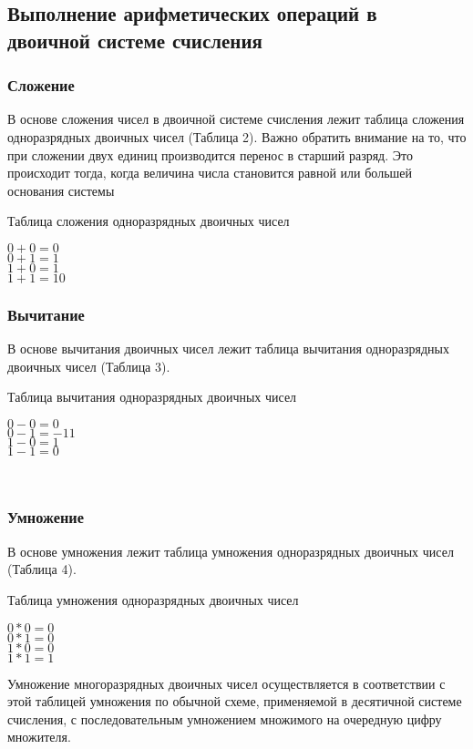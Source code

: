 \documentclass[a4paper]{article}
\begin{document}
\subsection{Выполнение арифметических операций в двоичной системе счисления}

\subsubsection{Сложение}
В основе сложения чисел в двоичной системе счисления лежит таблица сложения одноразрядных двоичных чисел (Таблица 2). Важно обратить внимание на то, что при сложении двух единиц производится перенос в старший разряд. Это происходит тогда, когда величина числа становится равной или большей основания системы
\begin{table}
  \caption{Таблица сложения одноразрядных двоичных чисел}
  \begin{center}
  $0 + 0 = 0$\\
  $0 + 1 = 1$\\
  $1 + 0 = 1$\\
  $1 + 1 = 10$\\
  \end{center}
\end{table}

\subsubsection{Вычитание}В основе вычитания двоичных чисел лежит таблица вычитания одноразрядных двоичных чисел (Таблица 3).
\begin{table}
  \caption{Таблица вычитания одноразрядных двоичных чисел}
  \begin{center}
  $0 - 0 = 0$\\
  $0 - 1 = -11$\\
  $1 - 0 = 1$\\
  $1 - 1 = 0$\\
  \end{center}
\end{table}
    
\subsubsection{Умножение}
В основе умножения лежит таблица умножения одноразрядных двоичных чисел (Таблица 4).
\begin{table}
  \caption{Таблица умножения одноразрядных двоичных чисел}
  \begin{center}
  $0 * 0 = 0$ \\
  $0 * 1 = 0$ \\
  $1 * 0 = 0$ \\
  $1 * 1 = 1$ \\
  \end{center}
\end{table}
Умножение многоразрядных двоичных чисел осуществляется в соответствии с этой таблицей умножения по обычной схеме, применяемой в десятичной системе счисления, с последовательным умножением множимого на очередную цифру множителя.
\end{document}
